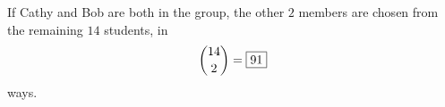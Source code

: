 If Cathy and Bob are both in the group, the other $2$ members are chosen from the remaining $14$ students, in
\[\dbinom{14}{2}=\boxed{91}\]
ways.
